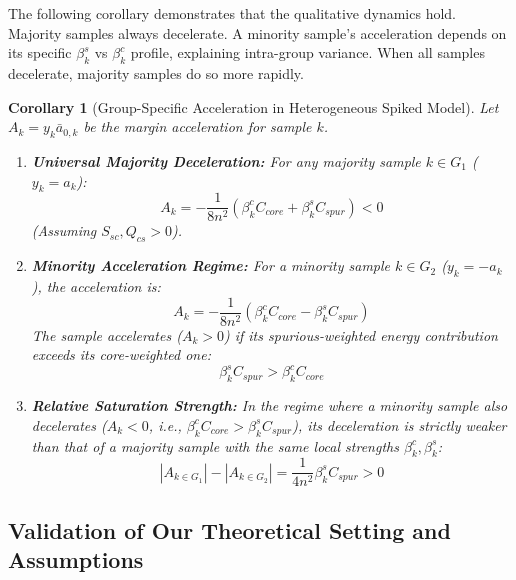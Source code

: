 \documentclass[letter,11pt]{article}
\newtheorem{corollary}{Corollary}
\begin{document}
The following corollary demonstrates that the qualitative dynamics hold. Majority samples always decelerate. A minority sample's acceleration depends on its specific $\beta^s_k$ vs $\beta^c_k$ profile, explaining intra-group variance. When all samples decelerate, majority samples do so more rapidly.
\begin{corollary}[Group-Specific Acceleration in Heterogeneous Spiked Model]\label{cor:global_accel_dynamics}
    Let $A_k = y_k \bar{a}_{0,k}$ be the margin acceleration for sample $k$.
    \begin{enumerate}
        \item \textbf{Universal Majority Deceleration:} For any majority sample $k \in G_1$ ($y_k = a_k$):
        \begin{equation}
            A_k = -\frac{1}{8n^2} (\beta^c_k C_{core} + \beta^s_k C_{spur}) < 0
        \end{equation}
        (Assuming $S_{sc}, Q_{cs} > 0$).
        \item \textbf{Minority Acceleration Regime:} For a minority sample $k \in G_2$ ($y_k = -a_k$), the acceleration is:
        \begin{equation}
            A_k = -\frac{1}{8n^2} (\beta^c_k C_{core} - \beta^s_k C_{spur})
        \end{equation}
        The sample accelerates ($A_k > 0$) if its spurious-weighted energy contribution exceeds its core-weighted one:
        \begin{equation}
            \beta^s_k C_{spur} > \beta^c_k C_{core}
        \end{equation}
        
        \item \textbf{Relative Saturation Strength:} In the regime where a minority sample also decelerates ($A_k < 0$, i.e., $\beta^c_k C_{core} > \beta^s_k C_{spur}$), its deceleration is strictly weaker than that of a majority sample with the same local strengths $\beta^c_k, \beta^s_k$:
        \begin{equation}
            |A_{k \in G_1}| - |A_{k \in G_2}| = \frac{1}{4n^2} \beta^s_k C_{spur} > 0
        \end{equation}
    \end{enumerate}
\end{corollary}


\subsection{Validation of Our Theoretical Setting and Assumptions}
\end{document}
